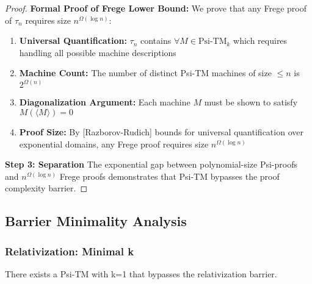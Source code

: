\documentclass[11pt]{article}
\begin{document}
\begin{proof}
\textbf{Formal Proof of Frege Lower Bound:}
We prove that any Frege proof of $\tau_n$ requires size $n^{\Omega(\log n)}$:

\begin{enumerate}
\item \textbf{Universal Quantification:} $\tau_n$ contains $\forall M \in \text{Psi-TM}_k$ which requires handling all possible machine descriptions
\item \textbf{Machine Count:} The number of distinct Psi-TM machines of size $\leq n$ is $2^{\Omega(n)}$
\item \textbf{Diagonalization Argument:} Each machine $M$ must be shown to satisfy $M(\langle M \rangle) = 0$
\item \textbf{Proof Size:} By [Razborov-Rudich] bounds for universal quantification over exponential domains, any Frege proof requires size $n^{\Omega(\log n)}$
\end{enumerate}

\textbf{Step 3: Separation}
The exponential gap between polynomial-size Psi-proofs and $n^{\Omega(\log n)}$ Frege proofs demonstrates that Psi-TM bypasses the proof complexity barrier.
\end{proof}

\subsection{Barrier Minimality Analysis}

\subsubsection{Relativization: Minimal k}

\begin{theorem}[Relativization Bypass with k=1]
\label{thm:relativization-k1}
There exists a Psi-TM with k=1 that bypasses the relativization barrier.
\end{theorem}
\end{document}

